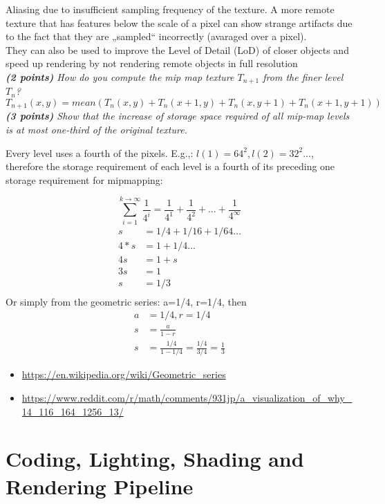 \documentclass[a4paper,10pt]{article}
\begin{document}
Aliasing due to insufficient sampling frequency of the texture. A more remote texture
that has features below the scale of a pixel can show strange artifacts due to the fact that they are „sampled“ incorrectly (avaraged over a pixel). \\

They can also be used to improve the Level of Detail (LoD) of closer objects and speed up rendering
by not rendering remote objects in full resolution\\

\textit{\textbf{(2 points)} How do you compute the mip map texture $T_{n+1}$ from the finer level $T_n$?}\\

\[T_{n+1}(x,y)=mean(T_n(x,y)+T_n(x+1,y)+T_n(x,y+1)+T_n(x+1,y+1))\]
\textit{\textbf{(3 points)} Show that the increase of storage space required of all mip-map levels is at most one-third of the original texture.}

Every level uses a fourth of the pixels. E.g.,:
$l(1)=64^2,l(2)=32^2…$, therefore the storage requirement of each level is a fourth of its preceding one storage requirement for mipmapping: 

\[\sum_{i=1}^{k\rightarrow\infty}\frac{1}{4^i}=\frac{1}{4^1}+\frac{1}{4^2}+...+\frac{1}{4^\infty}
\]
\[
\begin{aligned}
s&=1/4+1/16+1/64…\\
4*s&=1+1/4…\\
4s&=1+s\\
3s&=1\\
s&=1/3\\
\end{aligned}
\]
Or simply from the geometric series: a=1/4, r=1/4,
then 
\[
\begin{aligned}
a&=1/4, r=1/4\\
s&=\frac{a}{1-r}\\
s&=\frac{1/4}{1-1/4}=\frac{1/4}{3/4}=\frac{1}{3}
\end{aligned}\]

\begin{itemize}
	\item \url{https://en.wikipedia.org/wiki/Geometric_series}
	\item \url{
		https://www.reddit.com/r/math/comments/931jp/a_visualization_of_why_14_116_164_1256_13/}
\end{itemize}
\section{Coding, Lighting, Shading and Rendering Pipeline}
\end{document}
